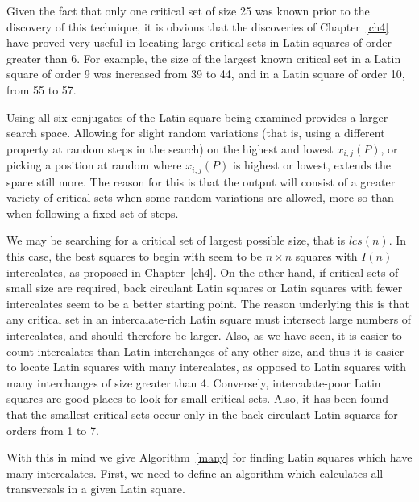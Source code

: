 \documentclass[12pt]{report}
\begin{document}
Given the fact that only one critical set of size 25 was known \cite{kho} prior
to the discovery of this technique, it is obvious that the
discoveries of Chapter~\ref{ch4} have proved very useful in locating large
critical sets in Latin squares of order greater than 6.  For example,
the size of the largest known critical set in a Latin square of order 9
was increased from 39 to 44, and in a Latin square of order 10, from 55
to 57.

Using all six conjugates of the Latin square being examined provides
a larger search space.  Allowing for slight random variations (that is,
using a different property at random steps in the search) on the highest
and lowest $x_{i,j}(P)$, or picking a position at random where $x_{i,j}(P)$
is highest or lowest, extends the space still more.  The reason for
this is that the output will consist of a greater variety of critical sets
when some random variations are allowed, more so than when following a
fixed set of steps.

We may be searching for a critical set of largest possible size,
that is $lcs(n)$.  In this case, the best squares to
begin with seem to be $n \times n$ squares with $I(n)$ intercalates,
as proposed in Chapter~\ref{ch4}.  On the other hand, if critical sets of small
size are required, back circulant Latin squares or Latin squares with
fewer intercalates seem to be a better starting point.  The reason underlying
this is that any critical set in an intercalate-rich Latin square
must intersect large numbers of intercalates, and should therefore be
larger.  Also, as we have seen, it is easier to count 
intercalates than Latin interchanges of any other size, and thus
it is easier to locate Latin squares with many intercalates, as opposed
to Latin squares with many interchanges of size greater than 4.  Conversely,
intercalate-poor Latin squares are good places to look for small critical
sets.  Also, it has been found that the smallest critical sets occur
only in the back-circulant Latin squares for orders from 1 to 7.~\cite{AK2}

With this in mind we give Algorithm~\ref{many} for finding Latin
squares which have many intercalates.  First, we need to define
an algorithm which calculates all transversals in a given Latin square.
\end{document}

